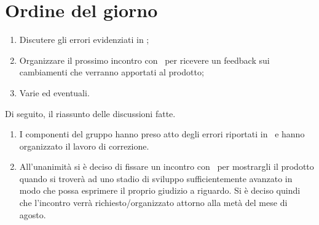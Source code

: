 \documentclass[../AnalisiDeiRequisiti.tex]{subfiles}
\begin{document}
	\section*{Ordine del giorno}
	\begin{enumerate}
		\item Discutere gli errori evidenziati in \revisionediqualifica;
		\item Organizzare il prossimo incontro con \proponente\ per ricevere un feedback sui cambiamenti che verranno 
		apportati al prodotto;
		\item Varie ed eventuali.
	\end{enumerate}
	Di seguito, il riassunto delle discussioni fatte.
	\begin{enumerate}
		\item I componenti del gruppo hanno preso atto degli errori riportati in \revisionediqualifica\ e hanno
		organizzato il lavoro di correzione.
		\item All'unanimità si è deciso di fissare un incontro con \proponente\ per mostrargli il prodotto quando si
		troverà ad uno stadio di sviluppo sufficientemente avanzato in modo che possa esprimere il proprio giudizio a
		riguardo. Si è deciso quindi che l'incontro verrà richiesto/organizzato attorno alla metà del mese di agosto.
	\end{enumerate}
\end{document}
